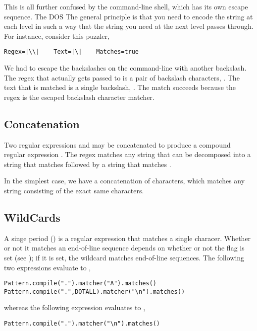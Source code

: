 This is all further confused by the command-line shell, which has its
own escape sequence.  The DOS The general principle is that you need to encode
the string at each level in such a way that the string you need at the
next level passes through.  For instance, consider this puzzler,
%
\begin{verbatim}
Regex=|\\|    Text=|\|    Matches=true
\end{verbatim}
%
We had to escape the backslashes on the command-line with another
backslash.  The regex that actually gets passed to 
is a pair of backslash characters, \code{\bk\bk}.  The text that
is matched is a single backslash, \code{\bk}.  The match succeeds
because the regex \code{\bk\bk} is the escaped backslash character
matcher.

\subsection{Concatenation}

Two regular expressions  and  may be
concatenated to produce a compound regular expression .
The regex  matches any string that can be decomposed into
a string that matches  followed by a string that matches
.

In the simplest case, we have a concatenation of characters, which
matches any string consisting of the exact same characters.  

\subsection{WildCards}

A singe period () is a regular expression that matches a
single characer.  Whether or not it matches an end-of-line sequence
depends on whether or not the  flag is set (see
); if it is set, the wildcard matches
end-of-line sequences.  The following two expressions evaluate to
,
%
\begin{verbatim}
Pattern.compile(".").matcher("A").matches()
Pattern.compile(".",DOTALL).matcher("\n").matches()
\end{verbatim}
%
whereas the following expression evaluates to ,
%
\begin{verbatim}
Pattern.compile(".").matcher("\n").matches()
\end{verbatim}


